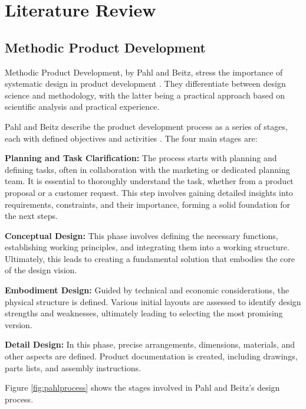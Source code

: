 \chapter{Literature Review}
\label{ch:literaturereview}

\section{Methodic Product Development}
\label{sec:methodicproductdevelopment}
Methodic Product Development, by Pahl and Beitz, stress the importance of systematic design in product development \cite[9]{Pahl2007}. They differentiate between design science and methodology, with the latter being a practical approach based on scientific analysis and practical experience.

Pahl and Beitz describe the product development process as a series of stages, each with defined objectives and activities \cite[128-133]{Pahl2007}. The four main stages are:

\textbf{Planning and Task Clarification:} The process starts with planning and defining tasks, often in collaboration with the marketing or dedicated planning team. It is essential to thoroughly understand the task, whether from a product proposal or a customer request. This step involves gaining detailed insights into requirements, constraints, and their importance, forming a solid foundation for the next steps.

\textbf{Conceptual Design:} This phase involves defining the necessary functions, establishing working principles, and integrating them into a working structure. Ultimately, this leads to creating a fundamental solution that embodies the core of the design vision.

\textbf{Embodiment Design:} Guided by technical and economic considerations, the physical structure is defined. Various initial layouts are assessed to identify design strengths and weaknesses, ultimately leading to selecting the most promising version.

\textbf{Detail Design:} In this phase, precise arrangements, dimensions, materials, and other aspects are defined. Product documentation is created, including drawings, parts lists, and assembly instructions.

Figure \ref{fig:pahlprocess} shows the stages involved in Pahl and Beitz's design process.

